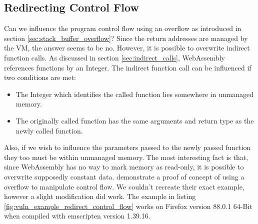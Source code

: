 \documentclass[sigconf]{acmart}
\begin{document}
\subsection{Redirecting Control Flow}
Can we influence the program control flow using an overflow as introduced in section \ref{sec:stack_buffer_overflow}? Since the return addresses are managed by the VM, the answer seems to be no. However, it is possible to overwrite indirect function calls. As discussed in section \ref{sec:indirect_calls}, WebAssembly references functions by an Integer. The indirect function call can be influenced if two conditions are met:

\begin{itemize}
\item The Integer which identifies the called function lies somewhere in unmanaged memory.
\item The originally called function has the same arguments and return type as the newly called function.
\end{itemize}

Also, if we wish to influence the parameters passed to the newly passed function they too must be within unmanaged memory. The most interesting fact is that, since WebAssembly has no way to mark memory as read-only, it is possible to overwrite supposedly constant data. \cite{mcfadden_security_2018} demonstrate a proof of concept of using a overflow to manipulate control flow. We couldn't recreate their exact example, however a slight modification did work. The example in listing \ref{fig:vuln_example_redirect_control_flow} works on Firefox version 88.0.1 64-Bit when compiled with emscripten version 1.39.16.
\end{document}
